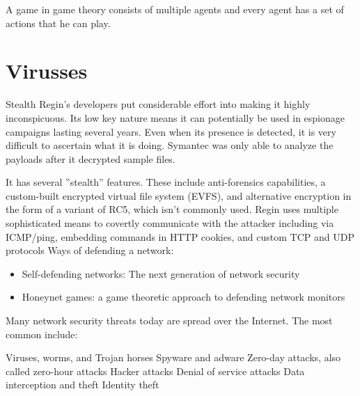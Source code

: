 A game in game theory consists of multiple agents and every agent has a set of actions that he can play. 








\section{Virusses}

Stealth
Regin's developers put considerable effort into making it highly inconspicuous. Its low key nature means it can potentially be used in espionage campaigns lasting several years. Even when its presence is detected, it is very difficult to ascertain what it is doing. Symantec was only able to analyze the payloads after it decrypted sample files.

It has several ''stealth'' features. These include anti-forensics capabilities, a custom-built encrypted virtual file system (EVFS), and alternative encryption in the form of a variant of RC5, which isn't commonly used. Regin uses multiple sophisticated means to covertly communicate with the attacker including via ICMP/ping, embedding commands in HTTP cookies, and custom TCP and UDP protocols
Ways of defending a network:
\begin{itemize}
\item Self-defending networks: The next generation of network security
\item Honeynet games: a game theoretic approach to defending network monitors

\end{itemize}
Many network security threats today are spread over the Internet. The most common include:

Viruses, worms, and Trojan horses
Spyware and adware
Zero-day attacks, also called zero-hour attacks
Hacker attacks
Denial of service attacks
Data interception and theft
Identity theft


